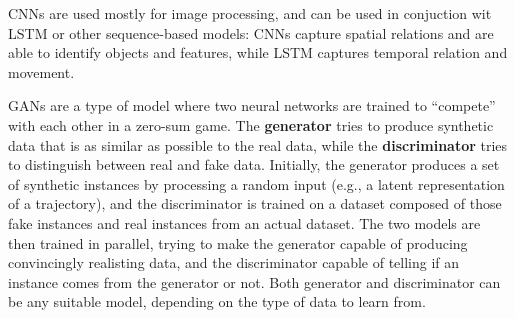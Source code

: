 CNNs are used mostly for image processing, and can be used in conjuction wit LSTM or other sequence-based models: CNNs capture spatial relations and are able to identify objects and features, while LSTM captures temporal relation and movement.

GANs are a type of model where two neural networks are trained to ``compete'' with each other in a zero-sum game. The \textbf{generator} tries to produce synthetic data that is as similar as possible to the real data, while the \textbf{discriminator} tries to distinguish between real and fake data. Initially, the generator produces a set of synthetic instances by processing a random input (e.g., a latent representation of a trajectory), and the discriminator is trained on a dataset composed of those fake instances and real instances from an actual dataset. The two models are then trained in parallel, trying to make the generator capable of producing convincingly realisting data, and the discriminator capable of telling if an instance comes from the generator or not. Both generator and discriminator can be any suitable model, depending on the type of data to learn from.